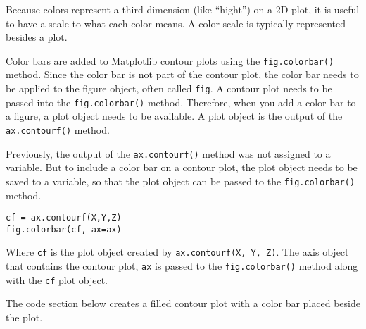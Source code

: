\documentclass{book}
\newcommand{\passthrough}[1]{#1}
\begin{document}
    
        Because colors represent a third dimension (like ``hight'') on a 2D
plot, it is useful to have a scale to what each color means. A color
scale is typically represented besides a plot.

Color bars are added to Matplotlib contour plots using the
\passthrough{\lstinline!fig.colorbar()!} method. Since the color bar is
not part of the contour plot, the color bar needs to be applied to the
figure object, often called \passthrough{\lstinline!fig!}. A contour
plot needs to be passed into the
\passthrough{\lstinline!fig.colorbar()!} method. Therefore, when you add
a color bar to a figure, a plot object needs to be available. A plot
object is the output of the \passthrough{\lstinline!ax.contourf()!}
method.

Previously, the output of the \passthrough{\lstinline!ax.contourf()!}
method was not assigned to a variable. But to include a color bar on a
contour plot, the plot object needs to be saved to a variable, so that
the plot object can be passed to the
\passthrough{\lstinline!fig.colorbar()!} method.

\begin{lstlisting}
cf = ax.contourf(X,Y,Z)
fig.colorbar(cf, ax=ax)
\end{lstlisting}

Where \passthrough{\lstinline!cf!} is the plot object created by
\passthrough{\lstinline!ax.contourf(X, Y, Z)!}. The axis object that
contains the contour plot, \passthrough{\lstinline!ax!} is passed to the
\passthrough{\lstinline!fig.colorbar()!} method along with the
\passthrough{\lstinline!cf!} plot object.

The code section below creates a filled contour plot with a color bar
placed beside the plot.
    
\end{document}
